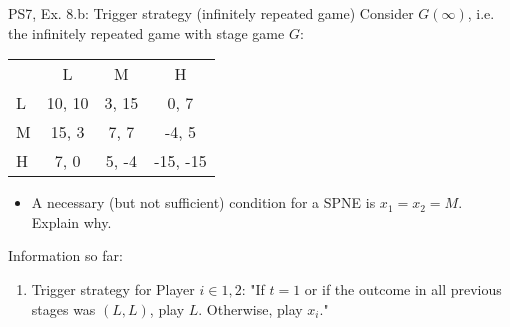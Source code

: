 \begin{frame}{PS7, Ex. 8.b: Trigger strategy (infinitely repeated game)}
    Consider $G(\infty)$, i.e. the infinitely repeated game with stage game $G$: \vspace{-6pt}
    \begin{table}
      \begin{tabular}{l|c|c|c|}
        \multicolumn{1}{c}{} & \multicolumn{1}{c}{L} & \multicolumn{1}{c}{M} & \multicolumn{1}{c}{H} \\\cline{2-4}
        L & 10, 10 & 3, 15 & 0, 7 \\\cline{2-4}
        M & 15, 3 & 7, 7 & -4, 5 \\\cline{2-4}
        H & 7, 0 & 5, -4 & -15, -15 \\\cline{2-4}
      \end{tabular}
    \end{table}
    \begin{itemize}
      \item[(b)] A necessary (but not sufficient) condition for a SPNE is $x_1 = x_2 = M$. Explain why.
    \end{itemize}
  \begin{multicols}{2}
    \vfill\null\columnbreak
    Information so far:
    \begin{enumerate}
      \item Trigger strategy for Player $i\in1,2$: "If $t=1$ or if the outcome in all previous stages was $(L,L)$, play $L$. Otherwise, play $x_i$."
    \end{enumerate}
    \vfill\null
  \end{multicols}
\end{frame}
